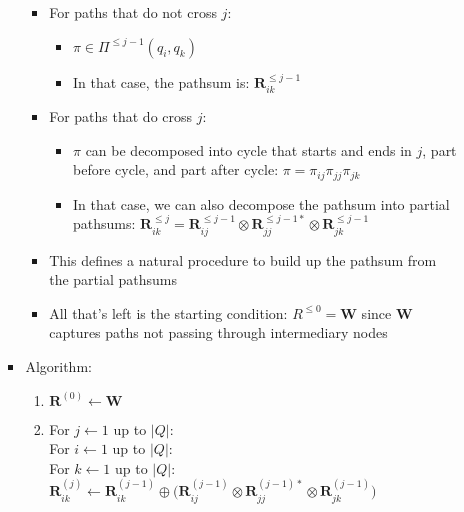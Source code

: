 \begin{itemize}
\begin{itemize}
\begin{itemize}
\begin{itemize}
                \item For paths that do not cross $j$: 
                \begin{itemize}
                    \item $
                    \pi \in \Pi^{\leq j-1}(q_i, q_k)
                    $
                    \item In that case, the pathsum is:
                    $
                    \boldsymbol{R}_{ik}^{\leq j-1}
                    $
                \end{itemize}
                \item For paths that do cross $j$: 
                \begin{itemize}
                    \item $\pi$ can be decomposed into cycle that starts and ends in $j$, part before cycle, and part after cycle: $
                    \pi = \pi_{ij} \pi_{jj} \pi_{jk}
                    $
                    \item In that case, we can also decompose the pathsum into partial pathsums:
                    $
                    \boldsymbol{R}_{ik}^{\leq j} = \boldsymbol{R}_{ij}^{\leq j-1} \otimes \boldsymbol{R}_{jj}^{\leq j-1 *} \otimes \boldsymbol{R}_{jk}^{\leq j-1}
                    $
                \end{itemize}
                \item This defines a natural procedure to build up the pathsum from the partial pathsums
                \item All that's left is the starting condition:
                $
                R^{\leq 0} = \boldsymbol{W}
                $ since $\boldsymbol{W}$ captures paths not passing through intermediary nodes
            \end{itemize}
            \item Algorithm:
            \begin{enumerate}
                \item $\boldsymbol{R}^{(0)} \gets \boldsymbol{W}$
                \item For $j \gets 1$ up to $|Q|$:\\
                For $i \gets 1$ up to $|Q|$:\\
                For $k \gets 1$ up to $|Q|$:
                $
                \boldsymbol{R}_{ik}^{(j)} \gets \boldsymbol{R}_{ik}^{(j-1)} \oplus \big(\boldsymbol{R}_{ij}^{(j-1)} \otimes \boldsymbol{R}_{jj}^{(j-1)*} \otimes \boldsymbol{R}_{jk}^{(j-1)}\big)
                $

\end{enumerate}
\end{itemize}
\end{itemize}
\end{itemize}
